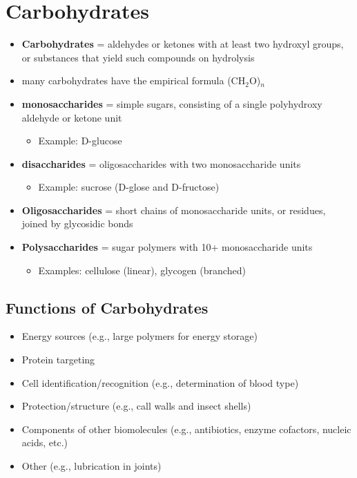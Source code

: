 \documentclass[10pt]{article}
\begin{document}
\section*{Carbohydrates}
\begin{itemize}
    \item \textbf{Carbohydrates} = aldehydes or ketones with at least two hydroxyl groups, or substances that yield such compounds on hydrolysis
    \item many carbohydrates have the empirical formula (CH$_2$O)$_n$
    \item \textbf{monosaccharides} = simple sugars, consisting of a single polyhydroxy aldehyde or ketone unit
    \begin{itemize}
        \item Example: D-glucose
    \end{itemize}
    \item \textbf{disaccharides} = oligosaccharides with two monosaccharide units
    \begin{itemize}
        \item Example: sucrose (D-glose and D-fructose)
    \end{itemize}
    \item \textbf{Oligosaccharides} = short chains of monosaccharide units, or residues, joined by glycosidic bonds
    \item \textbf{Polysaccharides} = sugar polymers with 10+ monosaccharide units
    \begin{itemize}
        \item Examples: cellulose (linear), glycogen (branched)
    \end{itemize}
\end{itemize}

\subsection*{Functions of Carbohydrates}
\begin{itemize}
    \item Energy sources (e.g., large polymers for energy storage)
    \item Protein targeting
    \item Cell identification/recognition (e.g., determination of blood type)
    \item Protection/structure (e.g., call walls and insect shells)
    \item Components of other biomolecules (e.g., antibiotics, enzyme cofactors, nucleic acids, etc.)
    \item Other (e.g., lubrication in joints)
\end{itemize}
\end{document}
